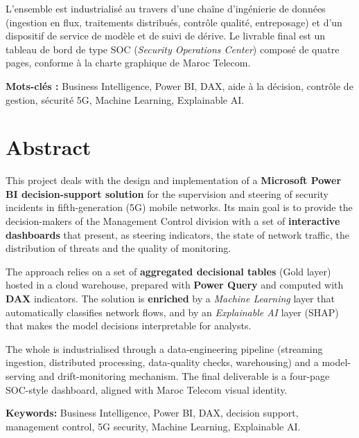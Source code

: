\documentclass[12pt,a4paper,oneside]{report}
\begin{document}
L'ensemble est industrialisé au travers d'une chaîne d'ingénierie de données (ingestion en flux, traitements distribués, contrôle qualité, entreposage) et d'un dispositif de service de modèle et de suivi de dérive. Le livrable final est un tableau de bord de type SOC (\emph{Security Operations Center}) composé de quatre pages, conforme à la charte graphique de Maroc Telecom.

\vspace{4pt}
\noindent\textbf{Mots-clés :} Business Intelligence, Power BI, DAX, aide à la décision, contrôle de gestion, sécurité 5G, Machine Learning, Explainable AI.

\chapter*{Abstract}

This project deals with the design and implementation of a \textbf{Microsoft Power BI decision-support solution} for the supervision and steering of security incidents in fifth-generation (5G) mobile networks. Its main goal is to provide the decision-makers of the Management Control division with a set of \textbf{interactive dashboards} that present, as steering indicators, the state of network traffic, the distribution of threats and the quality of monitoring.

The approach relies on a set of \textbf{aggregated decisional tables} (Gold layer) hosted in a cloud warehouse, prepared with \textbf{Power Query} and computed with \textbf{DAX} indicators. The solution is \textbf{enriched} by a \emph{Machine Learning} layer that automatically classifies network flows, and by an \emph{Explainable AI} layer (SHAP) that makes the model decisions interpretable for analysts.

The whole is industrialised through a data-engineering pipeline (streaming ingestion, distributed processing, data-quality checks, warehousing) and a model-serving and drift-monitoring mechanism. The final deliverable is a four-page SOC-style dashboard, aligned with Maroc Telecom visual identity.

\vspace{4pt}
\noindent\textbf{Keywords:} Business Intelligence, Power BI, DAX, decision support, management control, 5G security, Machine Learning, Explainable AI.

\cleardoublepage
{}
\tableofcontents
\listoffigures
\listoftables
\end{document}
